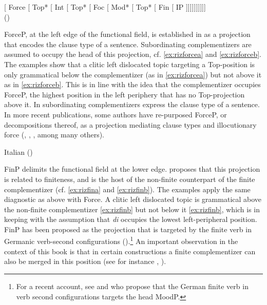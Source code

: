 \ea\label{struc:rizzall} {[} Force [ Top* [ Int [ Top* [ Foc [ Mod*  [ Top* [ Fin [ IP ]]]]]]]]]]\\ (\citealt{Rizzi2013})
\z 

ForceP, at the left edge of the functional field, is established in \citet{Rizzi1997} as  a projection that encodes the clause type of a sentence.  Subordinating complementizers are assumed to occupy the head of this projection, cf. \eqref{ex:rizforcea} and \eqref{ex:rizforceb}. The examples show that a clitic left dislocated topic targeting a Top-position is  only grammatical below the complementizer (as in \ref{ex:rizforcea}) but not  above it as in \eqref{ex:rizforceb}. This is in line with the idea that the complementizer occupies ForceP, the highest position in the left periphery that has no Top-projection above it.    In \citet{Rizzi1997}  subordinating complementizers express the clause type of a sentence. In more recent publications, some  authors have re-purposed ForceP, or decompositions thereof,  as a projection mediating clause types and illocutionary force (\citealt{SpeasTenny2003}, \citealt{Coniglio2010}, \citealt{Corr2016}, among many others).

\ea Italian (\citealt[288: ex 10a,b]{Rizzi1997})
	\z
\z

FinP delimits the functional field at the lower edge.  \citet{Rizzi1997}   proposes that this projection is related to finiteness, and  is the host of the non-finite counterpart of the finite complementizer (cf. \ref{ex:rizfina} and \ref{ex:rizfinb}). The examples apply the same diagnostic as above with Force. A clitic left dislocated topic is grammatical above the non-finite complementizer \eqref{ex:rizfinb} but not below it \eqref{ex:rizfinb}, which is in keeping with the assumption that \emph{di} occupies the lowest left-peripheral position. FinP has been proposed as the projection that is targeted by the finite verb in Germanic verb-second configurations (\citealt{Roberts2004}).\footnote{For a recent account, see \citet{Lohnstein2015} and \citet{Kocher2018b} who propose that the German finite verb in verb second configurations targets the  head MoodP.} An important observation in the context of this book is that in certain constructions a finite complementizer can also be merged in this position (see for instance \citealt{Belletti2009, Belletti2013},  \citealt{Ledgeway2005}). 

